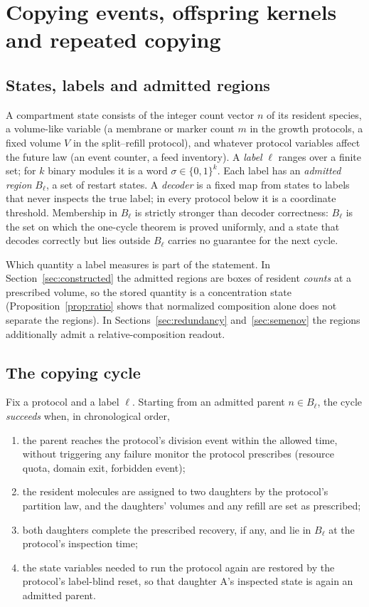 \section{Copying events, offspring kernels and repeated copying}\label{sec:events}

\subsection{States, labels and admitted regions}
A compartment state consists of the integer count vector $n$ of its resident species, a volume-like variable (a membrane or marker count $m$ in the growth protocols, a fixed volume $V$ in the split--refill protocol), and whatever protocol variables affect the future law (an event counter, a feed inventory). A \emph{label} $\ell$ ranges over a finite set; for $k$ binary modules it is a word $\sigma\in\{0,1\}^k$. Each label has an \emph{admitted region} $B_\ell$, a set of restart states. A \emph{decoder} is a fixed map from states to labels that never inspects the true label; in every protocol below it is a coordinate threshold. Membership in $B_\ell$ is strictly stronger than decoder correctness: $B_\ell$ is the set on which the one-cycle theorem is proved uniformly, and a state that decodes correctly but lies outside $B_\ell$ carries no guarantee for the next cycle.

Which quantity a label measures is part of the statement. In Section~\ref{sec:constructed} the admitted regions are boxes of resident \emph{counts} at a prescribed volume, so the stored quantity is a concentration state (Proposition~\ref{prop:ratio} shows that normalized composition alone does not separate the regions). In Sections~\ref{sec:redundancy} and~\ref{sec:semenov} the regions additionally admit a relative-composition readout.

\subsection{The copying cycle}
\begin{definition}\label{def:cycle}
Fix a protocol and a label $\ell$. Starting from an admitted parent $n\in B_\ell$, the cycle \emph{succeeds} when, in chronological order,
\begin{enumerate}[label=(\roman*)]
\item the parent reaches the protocol's division event within the allowed time, without triggering any failure monitor the protocol prescribes (resource quota, domain exit, forbidden event);
\item the resident molecules are assigned to two daughters by the protocol's partition law, and the daughters' volumes and any refill are set as prescribed;
\item both daughters complete the prescribed recovery, if any, and lie in $B_\ell$ at the protocol's inspection time;
\item the state variables needed to run the protocol again are restored by the protocol's label-blind reset, so that daughter A's inspected state is again an admitted parent.
\end{enumerate}
\end{definition}

